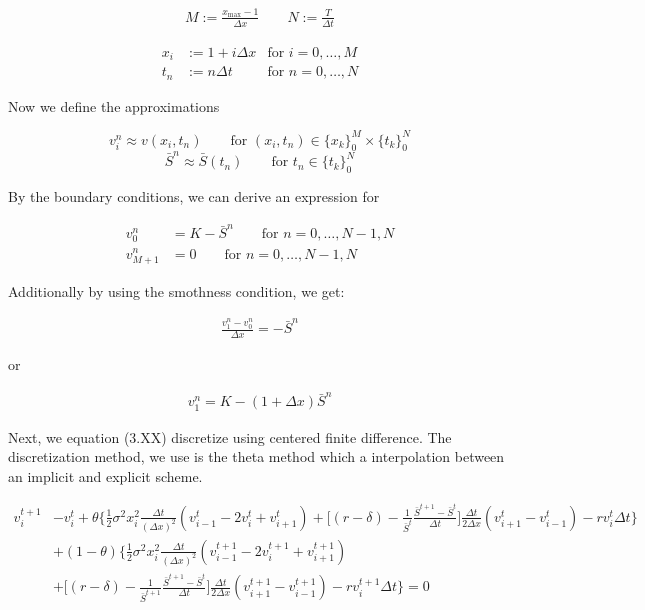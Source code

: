 \begin{align*}
    M := \frac{x_{\text{max}} - 1}{\Delta x}
    \qquad
    N := \frac{T}{\Delta t}
\end{align*}

\begin{align*}
   & & x_i &:= 1 + i{\Delta x} &\text{for $i = 0,\dots,M$} & & \\ 
   & & t_n &:= n{\Delta t} &\text{for $n = 0,\dots,N$} & &
\end{align*}

Now we define the approximations

\begin{equation}
    v^{n}_{i} \approx v(x_{i}, t_{n}) \qquad \text{for $(x_{i}, t_{n}) \in \{x_k\}^{M}_{0} \times \{t_k\}^{N}_{0}$} 
\end{equation}
\begin{equation}
    \bar{S}^{n} \approx \bar{S}(t_{n}) \qquad \text{for $t_{n} \in \{t_k\}^{N}_{0}$} 
\end{equation}

By the boundary conditions, we can derive an expression for

\begin{align}
    v^{n}_{0} &= K - \bar{S}^{n} \qquad \text{for $n = 0, \dots, N - 1, N$} \\
    v^{n}_{M+1} &= 0 \qquad \text{for $n = 0, \dots, N - 1, N$}
\end{align}

Additionally by using the smothness condition, we get:

\begin{align}
    \frac{v^{n}_{1} - v^{n}_0}{\Delta x} = -\bar{S}^{n}
\end{align}

or 

\begin{align}
    v^{n}_{1}= K - (1 + {\Delta x})\bar{S}^{n}
\end{align}

Next, we equation (3.XX) discretize using centered finite difference. The discretization
method, we use is the theta method which a interpolation between an implicit and explicit scheme.

\begin{equation}
    \begin{split}
        v^{t+1}_{i} &- v^{t}_{i} + \theta \bigg\{ \frac{1}{2}\sigma^2 x^{2}_{i} \frac{\Delta t}{(\Delta x)^2} (v^{t}_{i-1} - 2 v^{t}_{i} + v^{t}_{i+1}) + \bigg[ (r - \delta) - \frac{1}{\bar{S}^t} \frac{\bar{S}^{t+1} - \bar{S}^{t}}{\Delta t} \bigg] \frac{\Delta t}{2\Delta x} (v_{i+1}^{t} - v_{i-1}^{t}) - r v^{t}_{i} \Delta t \bigg\}
        \\ & + (1-\theta) \bigg\{ \frac{1}{2}\sigma^2 x^{2}_{i} \frac{\Delta t}{(\Delta x)^2}(v^{t+1}_{i-1} - 2 v^{t+1}_{i} + v^{t+1}_{i+1}) 
        \\ &  + \bigg[ (r - \delta) - \frac{1}{\bar{S}^{t+1}} \frac{\bar{S}^{t+1} - \bar{S}^{t}}{\Delta t} \bigg]\frac{\Delta t}{2\Delta x}(v_{i+1}^{t+1} - v_{i-1}^{t+1}) - r v^{t+1}_{i} \Delta t \bigg\} = 0
    \end{split}
\end{equation}


